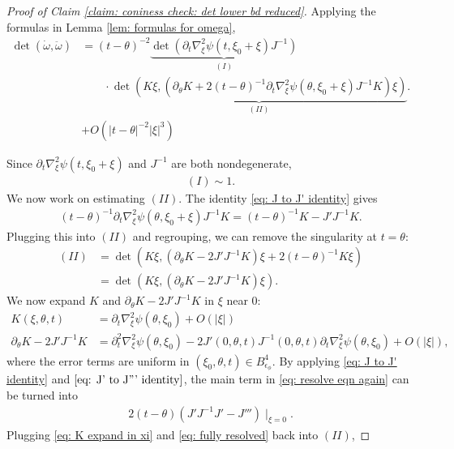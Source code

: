 \documentclass[12pt]{amsart}
\numberwithin{equation}{section}
\newcommand{\1}{\mathbbm{1}}
\newcommand{\xixi}{\xi_0 + \xi}
\newcommand{\Bphi}{B_{\epsilon_\phi}}
\begin{document}
\begin{proof}[Proof of Claim \ref{claim: coniness check: det lower bd reduced}]
Applying the formulas in Lemma \ref{lem: formulas for omega}, 
\begin{align}
    \det(\dot \omega, \ddot \omega) &= 
    (t - \theta)^{-2} \underbrace{ \det(\partial_t \nabla_\xi^2 \psi(t, \xixi) J^{-1})}_{(I)} \label{eq: full det I II expr} \\& \qquad\cdot \underbrace{\det(K\xi, (\partial_\theta K+2(t-\theta)^{-1}\partial_t \nabla_\xi^2 \psi(\theta, \xixi)J^{-1}K)\xi)}_{(II)}. \nonumber \\
    &+ O(|t-\theta|^{-2} |\xi|^3)
\end{align}

Since $\partial_t \nabla_\xi^2 \psi(t, \xixi)$ and $J^{-1}$ are both nondegenerate, 
\begin{align}
    (I) \sim 1. 
\end{align}
We now work on estimating $(II)$. The identity \eqref{eq: J to J' identity} gives 
\begin{align}
    (t - \theta)^{-1}\partial_t \nabla_\xi^2 \psi(\theta, \xixi) J^{-1} K = (t - \theta)^{-1} K - J' J^{-1} K.
\end{align}
Plugging this into $(II)$ and regrouping, we can remove the singularity at $t = \theta$:
\begin{align}
    (II) &= \det(K\xi, (\partial_\theta K - 2J' J^{-1} K)\xi + 2(t - \theta)^{-1} K\xi) \\
    &= \det(K\xi, (\partial_\theta K - 2 J'J^{-1}K)\xi).
\end{align}
We now expand $K$ and $\partial_\theta K - 2 J'J^{-1}K$ in $\xi$ near 0: 
\begin{align}
    K(\xi,\theta,t) &= \partial_t \nabla_\xi^2 \psi(\theta, \xi_0) + O(|\xi|) \label{eq: K expand in xi}\\
    \partial_\theta K - 2 J'J^{-1}K &= \partial_t^2 \nabla_\xi^2 \psi(\theta, \xi_0) - 2J'(0,\theta,t)J^{-1}(0,\theta, t) \partial_t \nabla_\xi^2 \psi(\theta, \xi_0) + O(|\xi|) \label{eq: resolve eqn again},
\end{align}
where the error terms are uniform in $(\xi_0, \theta, t) \in \Bphi^4$. By applying \eqref{eq: J to J' identity} and $\eqref{eq: J' to J''' identity}$, the main term in \eqref{eq: resolve eqn again} can be turned into 
\begin{align}\label{eq: fully resolved}
    2(t - \theta)(J' J^{-1} J' - J''')\mid_{\xi = 0}. 
\end{align}
Plugging \eqref{eq: K expand in xi} and \eqref{eq: fully resolved} back into $(II)$,

\end{proof}
\end{document}
